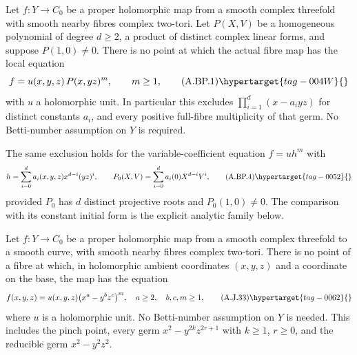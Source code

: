 
\begin{proposition}\hypertarget{tag-01BC}{}\label{cdp:st:A.5.21}


Let $f:Y\to C_0$ be a proper holomorphic map from a smooth
complex threefold with smooth nearby fibres complex
two-tori. Let $P(X,V)$ be a homogeneous polynomial of
degree $d\ge2$, a product of distinct complex linear
forms, and suppose $P(1,0)\ne0$.
There is no point at which the actual fibre map has
the local equation
\[
             f=u(x,y,z)\,P(x,yz)^m,
             \qquad m\ge1,                         \tag{A.BP.1}\hypertarget{tag-004W}{}\label{cdp:eq:A.BP.1}
\]
with $u$ a holomorphic unit. In particular this excludes
$\prod_{i=1}^d(x-a_i yz)$ for distinct constants $a_i$,
and every positive full-fibre multiplicity of that germ.
No Betti-number assumption on $Y$ is required.

The same exclusion holds for the variable-coefficient
equation $f=u h^m$ with
\[
 h=\sum_{i=0}^d a_i(x,y,z)x^{d-i}(yz)^i,
 \qquad P_0(X,V)=\sum_{i=0}^d a_i(0)X^{d-i}V^i,
                                                        \tag{A.BP.4}\hypertarget{tag-0052}{}\label{cdp:eq:A.BP.4}
\]
provided $P_0$ has $d$ distinct projective roots and
$P_0(1,0)\ne0$. The comparison with its constant
initial form is the explicit analytic family below.
\end{proposition}

\begin{proposition}\hypertarget{tag-01B5}{}\label{cdp:st:A.5.15}


Let $f:Y\to C_0$ be a proper holomorphic map from a
smooth complex threefold to a smooth curve, with smooth
nearby fibres complex two-tori. There is no point of
a fibre at which, in holomorphic ambient coordinates
$(x,y,z)$ and a coordinate on the base, the map has
the equation
\[
 f(x,y,z)=u(x,y,z)\bigl(x^a-y^bz^c\bigr)^m,
 \quad a\ge2,\quad b,c,m\ge1,                                    \tag{A.J.33}\hypertarget{tag-0062}{}\label{cdp:eq:A.J.33}
\]
where $u$ is a holomorphic unit. No Betti-number
assumption on $Y$ is needed. This includes the pinch
point, every germ $x^2-y^{2k}z^{2r+1}$ with
$k\ge1$, $r\ge0$, and the reducible germ
$x^2-y^2z^2$.
\end{proposition}

